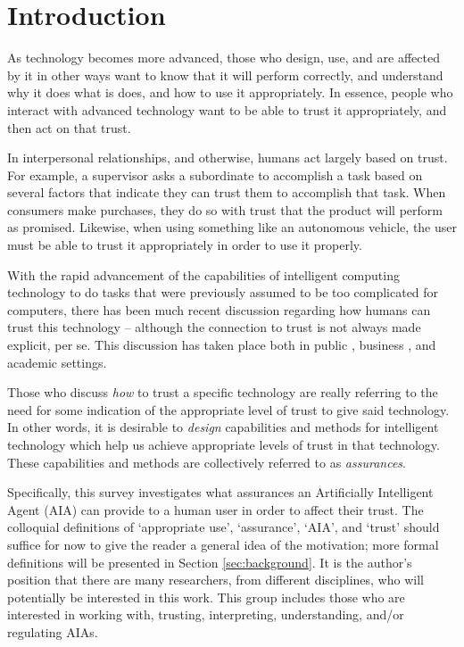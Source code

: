 \section{Introduction}
    As technology becomes more advanced, those who design, use, and are affected by it in other ways want to know that it will perform correctly, and understand why it does what is does, and how to use it appropriately. In essence, people who interact with advanced technology want to be able to trust it appropriately, and then act on that trust.

    In interpersonal relationships, and otherwise, humans act largely based on trust. For example, a supervisor asks a subordinate to accomplish a task based on several factors that indicate they can trust them to accomplish that task. When consumers make purchases, they do so with trust that the product will perform as promised. Likewise, when using something like an autonomous vehicle, the user must be able to trust it appropriately in order to use it properly.

    With the rapid advancement of the capabilities of intelligent computing technology to do tasks that were previously assumed to be too complicated for computers, there has been much recent discussion regarding how humans can trust this technology -- although the connection to trust is not always made explicit, per se. This discussion has taken place both in public \cite{Spectrum2016-jv,DeSteno2014-cq,Cranz2017-yh,Cassel2017-tn,Danks2017-sb,Wagner2016-ck}, business \cite{Banavar2016-nm, Khosravi2016-ke,Moody2017-vd,Rudnitsky2017-in,Benioff2016-tc,Tankard2016-rk}, and academic \cite{Groom2007-bz,Lloyd2014-bb,Goodrum_2016-fm,Foley2017-qj,Ghahramani2015-yq,Castelvecchi2016-mr} settings.

    Those who discuss \emph{how} to trust a specific technology are really referring to the need for some indication of the appropriate level of trust to give said technology. In other words, it is desirable to \emph{design} capabilities and methods for intelligent technology which help us achieve appropriate levels of trust in that technology. These capabilities and methods are collectively referred to as \emph{assurances}.
    
    Specifically, this survey investigates what assurances an Artificially Intelligent Agent (AIA) can provide to a human user in order to affect their trust. The colloquial definitions of `appropriate use', `assurance', `AIA', and `trust' should suffice for now to give the reader a general idea of the motivation; more formal definitions will be presented in Section \ref{sec:background}. It is the author's position that there are many researchers, from different disciplines, who will potentially be interested in this work. This group includes those who are interested in working with, trusting, interpreting, understanding, and/or regulating AIAs.

